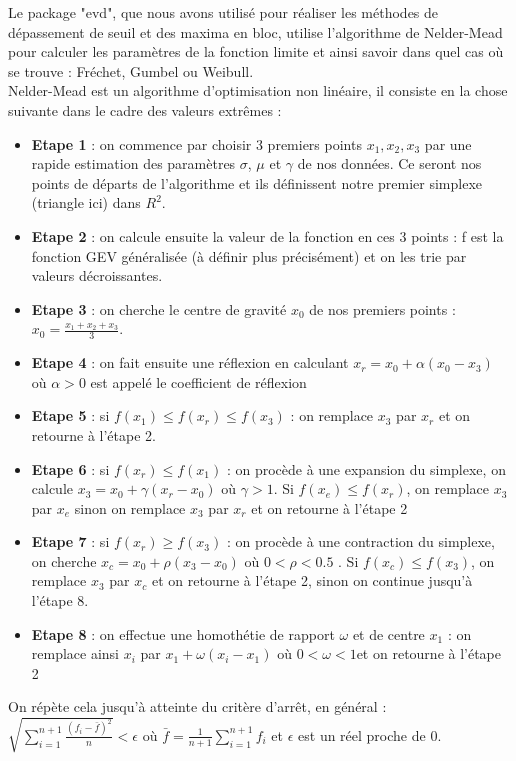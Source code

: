 \documentclass{article}
\theoremstyle{plain}
\theoremstyle{definition}
\theoremstyle{plain}
\begin{document}
\noindent Le package "evd", que nous avons utilisé pour réaliser les méthodes de dépassement de seuil et des maxima en bloc, utilise l'algorithme de Nelder-Mead pour calculer les paramètres de la fonction limite et ainsi savoir dans quel cas où se trouve : Fréchet, Gumbel ou Weibull. \\

\noindent Nelder-Mead est un algorithme d'optimisation non linéaire, il consiste en la chose suivante dans le cadre des valeurs extrêmes : 
\begin{itemize}
	\item \textbf{Etape 1} : on commence par choisir 3 premiers points $x_1, x_2, x_3$ par une rapide estimation des paramètres $\sigma$, $\mu$ et $\gamma$ de nos données. Ce seront nos points de départs de l'algorithme et ils définissent notre premier simplexe (triangle ici) dans $R^2$.
	\item \textbf{Etape 2} : on calcule ensuite la valeur de la fonction en ces 3 points : f est la fonction GEV généralisée (à définir plus précisément) et on les trie par valeurs décroissantes.
	\item \textbf{Etape 3} : on cherche le centre de gravité $x_0$ de nos premiers points : $x_0 = \frac{x_1 + x_2 + x_3}{3}$.
	\item \textbf{Etape 4} : on fait ensuite une réflexion en calculant $x_r = x_0 + \alpha (x_0 - x_3)$ où $\alpha > 0$ est appelé le coefficient de réflexion
	\item \textbf{Etape 5} : si $f(x_1) \le  f(x_r) \le  f(x_3)$ : on remplace $x_3$ par $x_r$ et on retourne à l'étape 2.
	\item \textbf{Etape 6} : si $f(x_r) \le  f(x_1)$ : on procède à une expansion du simplexe, on calcule $x_3 = x_0 + \gamma(x_r - x_0)$ où $\gamma > 1$. Si $f(x_e) \le  f(x_r) $, on remplace $x_3$ par $x_e$ sinon on remplace $x_3$ par $x_r$ et on retourne à l'étape 2
	\item \textbf{Etape 7} : si $f(x_r) \geq f(x_3)$ : on procède à une contraction du simplexe, on cherche $x_c = x_0 + \rho(x_3 - x_0)$ où $0 < \rho < 0.5 $ . Si $f(x_c) \le  f(x_3)$, on remplace $x_3$ par $x_c$ et on retourne à l'étape 2, sinon on continue jusqu'à l'étape 8.
	\item \textbf{Etape 8} : on effectue une homothétie de rapport $\omega$ et de centre $x_1$ : on remplace ainsi $x_i$ par $x_1 + \omega(x_i - x_1)$ où $0 < \omega < 1$et on retourne à l'étape 2
\end{itemize}

\noindent On répète cela jusqu'à atteinte du critère d'arrêt, en général : $ \sqrt{\sum_{i=1}^{n+1}  \frac{(f_i - \bar{f})^2}{n}} < \epsilon $ où $\bar{f} =\frac{1}{n+1} \sum_{i=1}^{n+1} f_i $ et $ \epsilon $ est un réel proche de 0. \\
\end{document}
